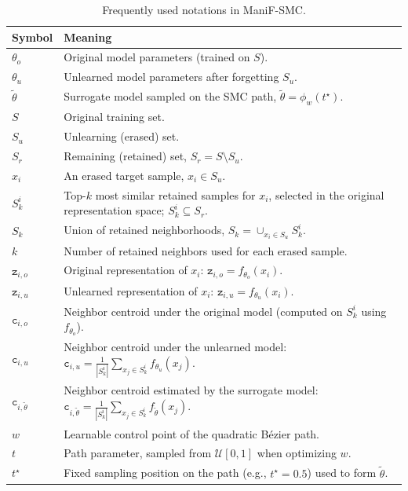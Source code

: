  \begin{table}[h]
 	\centering
 	\caption{Frequently used notations in ManiF-SMC. \vspace{-2mm}}
 	\label{tab:notation_manif_smc}
 	\footnotesize
 	\setlength{\tabcolsep}{6pt}
 	\renewcommand{\arraystretch}{1.0}
 	\begin{tabular}{@{}l p{}@{}}
 		\toprule
 		Symbol & Meaning \\
 		\midrule
 
 		$\theta_o$ & Original model parameters (trained on $S$).\\
 		$\theta_u$ & Unlearned model parameters after forgetting $S_u$.\\
 		$\tilde{\theta}$ & Surrogate model sampled on the SMC path, $\tilde{\theta}=\phi_w(t^\star)$.\\
 
 		$S$ & Original training set.\\
 		$S_u$ & Unlearning (erased) set.\\
 		$S_r$ & Remaining (retained) set, $S_r = S\setminus S_u$.\\
 		$x_i$ & An erased target sample, $x_i\in S_u$.\\
 		$S_k^i$ & Top-$k$ most similar retained samples for $x_i$, selected in the original representation space; $S_k^i\subseteq S_r$.\\
 		$S_k$ & Union of retained neighborhoods, $S_k=\cup_{x_i\in S_u} S_k^i$.\\
 		$k$ & Number of retained neighbors used for each erased sample.\\
 		$\texttt{z}_{i,o}$ & Original representation of $x_i$: $\texttt{z}_{i,o}=f_{\theta_o}(x_i)$.\\
 		$\texttt{z}_{i,u}$ & Unlearned representation of $x_i$: $\texttt{z}_{i,u}=f_{\theta_u}(x_i)$.\\
 		$\texttt{c}_{i,o}$ & Neighbor centroid under the original model (computed on $S_k^i$ using $f_{\theta_o}$).\\
 		$\texttt{c}_{i,u}$ & Neighbor centroid under the unlearned model: $\texttt{c}_{i,u}=\frac{1}{|S_k^i|}\sum_{x_j\in S_k^i} f_{\theta_u}(x_j)$.\\
 		$\texttt{c}_{i,\tilde{\theta}}$ & Neighbor centroid estimated by the surrogate model: $\texttt{c}_{i,\tilde{\theta}}=\frac{1}{|S_k^i|}\sum_{x_j\in S_k^i} f_{\tilde{\theta}}(x_j)$.\\
 		
 
 		$w$ & Learnable control point of the quadratic B\'ezier path.\\
 		$t$ & Path parameter, sampled from $\mathcal{U}[0,1]$ when optimizing $w$.\\
 		$t^\star$ & Fixed sampling position on the path (e.g., $t^\star=0.5$) used to form $\tilde{\theta}$.\\
 
 
 		\bottomrule
 	\end{tabular}
 	\vspace{-2mm}
 \end{table}
 
